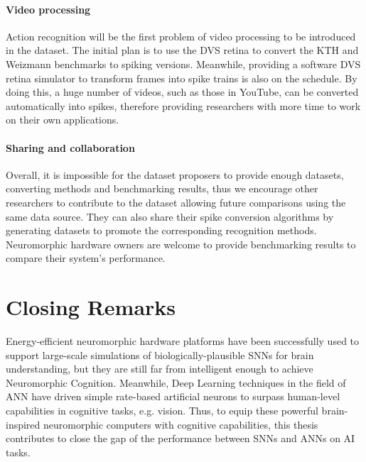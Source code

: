 \paragraph{Video processing}
Action recognition will be the first problem of video processing to be introduced in the dataset.
The initial plan is to use the DVS retina to convert the KTH and Weizmann benchmarks to spiking versions.
Meanwhile, providing a software DVS retina simulator to transform frames into spike trains is also on the schedule.
By doing this, a huge number of videos, such as those in YouTube, can be converted automatically into spikes, therefore providing researchers with more time to work on their own applications.

\paragraph{Sharing and collaboration}
Overall, it is impossible for the dataset proposers to provide enough datasets, converting methods and benchmarking results, thus we encourage other researchers to contribute to the dataset allowing future comparisons using the same data source.
They can also share their spike conversion algorithms by generating datasets to promote the corresponding recognition methods.
Neuromorphic hardware owners are welcome to provide benchmarking results to compare their system's performance.
\section{Closing Remarks}


Energy-efficient neuromorphic hardware platforms have been successfully used to support large-scale simulations of biologically-plausible SNNs for brain understanding, but they are still far from intelligent enough to achieve Neuromorphic Cognition.
Meanwhile, Deep Learning techniques in the field of ANN have driven simple rate-based artificial neurons to surpass human-level capabilities in cognitive tasks, e.g. vision.
Thus, to equip these powerful brain-inspired neuromorphic computers with cognitive capabilities, this thesis contributes to close the gap of the performance between SNNs and ANNs on AI tasks.

